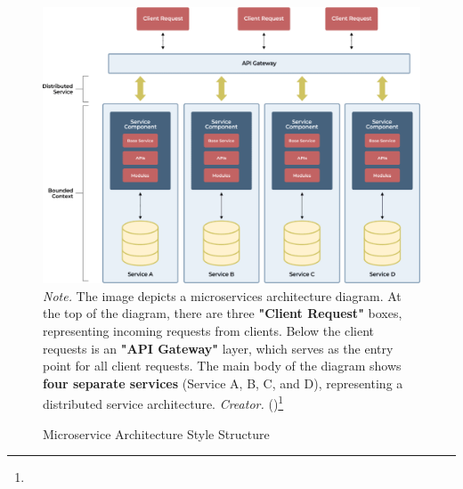 \begin{figure}[H]
\caption{Microservice Architecture Style Structure}
\centering
\includegraphics[width=1\linewidth]{images/Microservice-Architecture-img-1-1024x749.png}
\small
\textit{Note.} The image depicts a microservices architecture diagram. At the top of the diagram, there are three \textbf{"Client Request"} boxes, representing incoming requests from clients. Below the client requests is an \textbf{"API Gateway"} layer, which serves as the entry point for all client requests. The main body of the diagram shows \textbf{four separate services} (Service A, B, C, and D), representing a distributed service architecture.
\textit{Creator.} (\cite{micro})\footnote[40]{}
\end{figure}